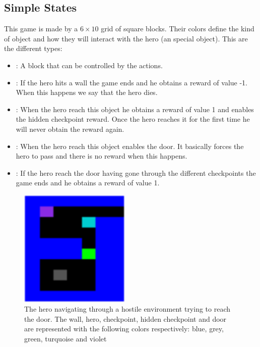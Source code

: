 \subsection{Simple States\label{subsec:SimpleStates}}

This game is made by a $6 \times 10$ grid of square blocks.
Their colors define the kind of object and how they will interact with the hero (an special object).
This are the different types:
\begin{itemize}
  \item {}: A block that can be controlled by the actions.
  \item {}: If the hero hits a wall the game ends and he obtains a reward of value -1.
  When this happens we say that the hero dies.
  \item {}: When the hero reach this object he obtains a reward of value 1 and enables the hidden
  checkpoint reward.
  Once the hero reaches it for the first time he will never obtain the reward again.
  \item {}: When the hero reach this object enables the door.
  It basically forces the hero to pass and there is no reward when this happens.
  \item {}: If the hero reach the door having gone through the different checkpoints the game ends and
  he obtains a reward of value 1.
\end{itemize}

\begin{figure}[hbtp]
\begin{center}
\includegraphics[width=200]{img/SimpleStates_going_up.png}
\end{center}
\caption[Simple States game]
{The hero navigating through a hostile environment trying to reach the door. The wall, hero, checkpoint, hidden checkpoint
and door are represented with the following colors respectively: blue, grey, green, turquoise and violet}
\label{fig:SimpleStates}
\end{figure}

